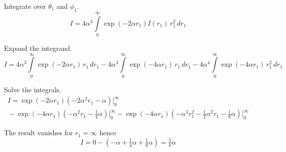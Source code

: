 \documentclass[12pt]{article}
\begin{document}
\noindent
Integrate over $\theta_1$ and $\phi_1$.
\begin{equation*}
I=4\alpha^3\int\limits_0^\infty
\exp(-2\alpha r_1)I(r_1)\,r_1^2\,dr_1
\end{equation*}

\noindent
Expand the integrand.
\begin{equation*}
I=4\alpha^3\int\limits_0^\infty\exp(-2\alpha r_1)\,r_1\,dr_1
-4\alpha^3\int\limits_0^\infty\exp(-4\alpha r_1)\,r_1\,dr_1
-4\alpha^4\int\limits_0^\infty\exp(-4\alpha r_1)\,r_1^2\,dr_1
\end{equation*}

\noindent
Solve the integrals.
\begin{multline*}
I=\exp(-2\alpha r_1)\left(-2\alpha^2r_1-\alpha\right)\bigg|_0^\infty
\\
{}-\exp(-4\alpha r_1)\left(-\alpha^2r_1-\tfrac{1}{4}\alpha\right)\bigg|_0^\infty
{}-\exp(-4\alpha r_1)\left(-\alpha^3r_1^2-\tfrac{1}{2}\alpha^2r_1-\tfrac{1}{8}\alpha\right)\bigg|_0^\infty
\end{multline*}

\noindent
The result vanishes for $r_1=\infty$ hence
\begin{equation*}
I=0-\left(-\alpha+\tfrac{1}{4}\alpha+\tfrac{1}{8}\alpha\right)=\tfrac{5}{8}\alpha
\tag{7}
\end{equation*}
\end{document}
